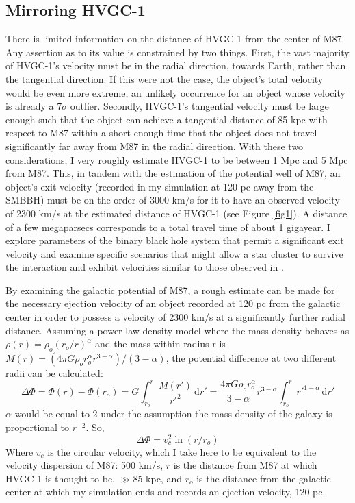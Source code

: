\documentclass{aastex62}
\begin{document}
\subsection{Mirroring HVGC-1}
There is limited information on the distance of HVGC-1 from the center of M87. Any assertion as to its value is constrained by two things. First, the vast majority of HVGC-1's velocity must be in the radial direction, towards Earth, rather than the tangential direction. If this were not the case, the object's total  velocity would be even more extreme, an unlikely occurrence for an object whose velocity is already a 7$\sigma$ outlier. Secondly, HVGC-1's tangential velocity must be large enough such that the object can achieve a tangential distance of 85 kpc with respect to M87 within a short enough time that the object does not travel significantly far away from M87 in the radial direction. With these two considerations, I very roughly estimate HVGC-1 to be between 1 Mpc and 5 Mpc from M87. This, in tandem with the estimation of the potential well of M87, an object's exit velocity (recorded in my simulation at 120 pc away from the SMBBH) must be on the order of 3000 km/s for it to have an observed velocity of 2300 km/s at the estimated distance of HVGC-1 (see Figure \ref{fig1}). A distance of a few megaparsecs corresponds to a total travel time of about 1 gigayear. I explore parameters of the binary black hole system that permit a significant exit velocity and examine specific scenarios that might allow a star cluster to survive the interaction and exhibit velocities similar to those observed in \citet{cald14}.

By examining the galactic potential of M87, a rough estimate can be made for the necessary ejection velocity of an object recorded at 120 pc from the galactic center in order to possess a velocity of 2300 km/s at a significantly further radial distance. Assuming a power-law density model where the mass density behaves as $\rho(r) = \rho_{o}(r_{o}/r)^\alpha$ and the mass within radius r is $M(r) = (4\pi G\rho_{o}r_{o}^\alpha r^{3-\alpha})/(3-\alpha)$, the potential difference at two different radii can be calculated:
\begin{equation}
\Delta\Phi = \Phi(r) - \Phi(r_{o}) = G\int_{r_{o}}^{r} \! \frac{M(r')}{r'^2} \, \mathrm{d}r' = \frac{4\pi G\rho_{o}r_{o}^\alpha }{3-\alpha} r^{3-\alpha}\int_{r_{o}}^{r} \! r'^{1-\alpha} \, \mathrm{d}r'
\end{equation}
 $\alpha$ would be equal to 2 under the assumption the mass density of the galaxy is proportional to $r^{-2}$. So,
\begin{equation}
 \Delta\Phi= v_{c}^{2}\ln(r/r_{o})
\end{equation}
Where $v_{c}$ is the circular velocity, which I take here to be equivalent to the velocity dispersion of M87: 500 km/s, $r$ is the distance from M87 at which HVGC-1 is thought to be, $\gg$85 kpc, and $r_{o}$ is the distance from the galactic center at which my simulation ends and records an ejection velocity, 120 pc. 
\end{document}
